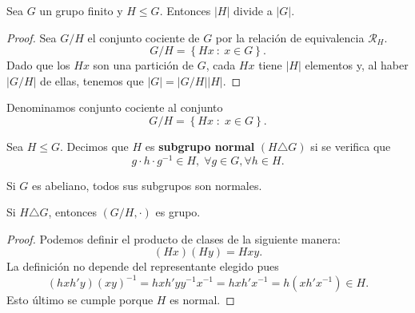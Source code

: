 \begin{ftheorem}
\normalfont Sea $\displaystyle G $ un grupo finito y $\displaystyle H \leq G $. Entonces $\displaystyle \left|H\right| $ divide a $\displaystyle \left|G\right| $.
\end{ftheorem}

\begin{proof}
Sea $\displaystyle G/H $ el conjunto cociente de $\displaystyle G $ por la relación de equivalencia $\displaystyle \mathcal{R}_{H} $. 
\[G/H = \left\{ Hx \: : \: x \in G\right\}  .\]
Dado que los $\displaystyle Hx $ son una partición de $\displaystyle G $, cada $\displaystyle Hx $ tiene $\displaystyle \left|H\right| $ elementos y, al haber $\displaystyle \left|G/H\right| $ de ellas, tenemos que $\displaystyle \left|G\right| = \left|G/H\right| \left|H\right| $.
\end{proof}

\begin{fdefinition}
\normalfont Denominamos conjunto cociente al conjunto
\[G/H = \left\{ Hx \; : \; x \in G\right\}  .\]
\end{fdefinition}

\begin{fdefinition}
\normalfont Sea $\displaystyle H \leq G $. Decimos que $\displaystyle H $ es \textbf{subgrupo normal} $\displaystyle \left(H \triangle G\right) $ si se verifica que 
\[g \cdot h \cdot g^{-1} \in H, \; \forall g \in G, \forall h \in H .\]
\end{fdefinition}

\begin{observation}
\normalfont Si $\displaystyle G $ es abeliano, todos sus subgrupos son normales.
\end{observation}

\begin{fprop}[]
\normalfont Si $\displaystyle H \triangle G $, entonces $\displaystyle \left(G/H, \cdot \right) $ es grupo.
\end{fprop}

\begin{proof}
Podemos definir el producto de clases de la siguiente manera:
\[\left(Hx\right)\left(Hy\right) = Hxy .\]
La definición no depende del representante elegido pues
\[\left(hxh'y\right)\left(xy\right)^{-1} = hxh'yy^{-1}x^{-1}=hxh'x^{-1}=h\left(xh'x^{-1}\right) \in H .\]
Esto último se cumple porque $\displaystyle H $ es normal.
\end{proof}

